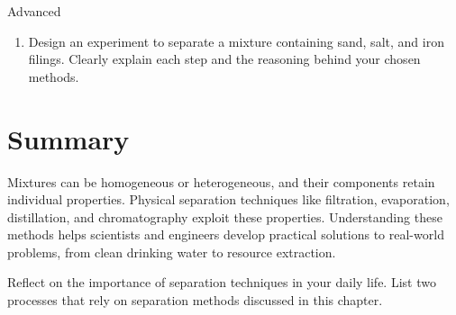 \begin{tieredquestions}{Advanced}
\begin{enumerate}
    \item Design an experiment to separate a mixture containing sand, salt, and iron filings. Clearly explain each step and the reasoning behind your chosen methods.
\end{enumerate}
\end{tieredquestions}

\section{Summary}
Mixtures can be homogeneous or heterogeneous, and their components retain individual properties. Physical separation techniques like filtration, evaporation, distillation, and chromatography exploit these properties. Understanding these methods helps scientists and engineers develop practical solutions to real-world problems, from clean drinking water to resource extraction.

\begin{stopandthink}
Reflect on the importance of separation techniques in your daily life. List two processes that rely on separation methods discussed in this chapter.
\end{stopandthink}